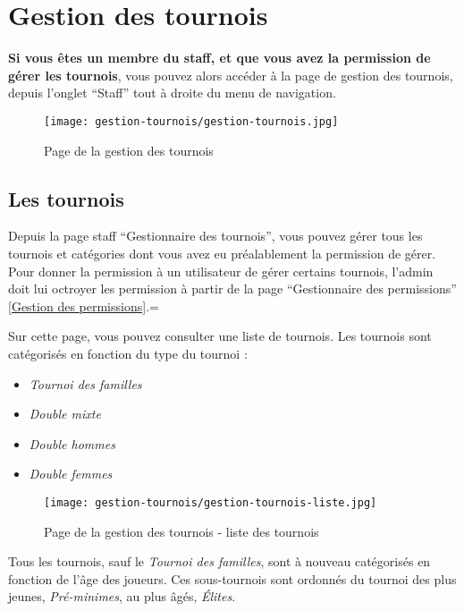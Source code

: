 \section{Gestion des tournois}

\textbf{Si vous êtes un membre du staff, et que vous avez la permission de gérer les tournois}, vous pouvez alors accéder à la page de gestion des tournois, depuis l'onglet \enquote{Staff} tout à droite du menu de navigation.

\begin{figure}[H]
\centering
\texttt{[image: gestion-tournois/gestion-tournois.jpg]}
\caption{Page de la gestion des tournois}
\end{figure}

\subsection{Les tournois}

Depuis la page staff \enquote{Gestionnaire des tournois}, vous pouvez gérer tous les tournois et catégories dont vous avez eu préalablement la permission de gérer. Pour donner la permission à un utilisateur de gérer certains tournois, l'admin doit lui octroyer les permission à partir de la page \enquote{Gestionnaire des permissions} \ref{Gestion des permissions}.\newline =

Sur cette page, vous pouvez consulter une liste de tournois. Les tournois sont catégorisés en fonction du type du tournoi :

\begin{itemize}
\item \textit{Tournoi des familles}
\item \textit{Double mixte}
\item \textit{Double hommes}
\item \textit{Double femmes}
\end{itemize}

\begin{figure}[H]
\centering
\texttt{[image: gestion-tournois/gestion-tournois-liste.jpg]}
\caption{Page de la gestion des tournois - liste des tournois}
\end{figure}

Tous les tournois, sauf le \textit{Tournoi des familles}, sont à nouveau catégorisés en fonction de l'âge des joueurs. Ces sous-tournois sont ordonnés du tournoi des plus jeunes, \textit{Pré-minimes}, au plus âgés, \textit{Élites}.\newline

